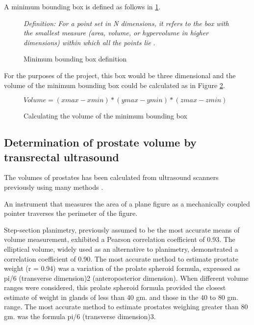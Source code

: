 A minimum bounding box is defined as follows in \ref{fig:bounding_box_definition}.\\

\begin{figure}[h]
\textit{Definition: For a point set in N dimensions, it refers to the box with the smallest measure (area, volume, or hypervolume in higher dimensions) within which all the points lie} \cite{Barequet2001}.
\caption {Minimum bounding box definition}
\label{fig:bounding_box_definition}
\end{figure}

For the purposes of the project, this box would be three dimensional and the volume of the minimum bounding box could be calculated as in Figure \ref{fig:calculating_the_volume_of_the_minimum_bounding_box}.\\

\begin{figure}[h]
\begin{center}
$Volume = (xmax -xmin) * (ymax - ymin) * (zmax - zmin)$
\end{center}
\caption{Calculating the volume of the minimum bounding box}
\label{fig:calculating_the_volume_of_the_minimum_bounding_box}
\end{figure}

\subsection{Determination of prostate volume by transrectal ultrasound}

The volumes of prostates has been calculated from ultrasound scanners previously using many methods \cite{K1991}.

An instrument that measures the area of a plane figure as a mechanically coupled pointer traverses the perimeter of the figure.



Step-section planimetry, previously assumed to be the most accurate means of volume measurement, exhibited a Pearson correlation coefficient of 0.93. The elliptical volume, widely used as an alternative to planimetry, demonstrated a correlation coefficient of 0.90. The most accurate method to estimate prostate weight (r = 0.94) was a variation of the prolate spheroid formula, expressed as pi/6 (transverse dimension)2 (anteroposterior dimension). When different volume ranges were considered, this prolate spheroid formula provided the closest estimate of weight in glands of less than 40 gm. and those in the 40 to 80 gm. range. The most accurate method to estimate prostates weighing greater than 80 gm. was the formula pi/6 (transverse dimension)3. 